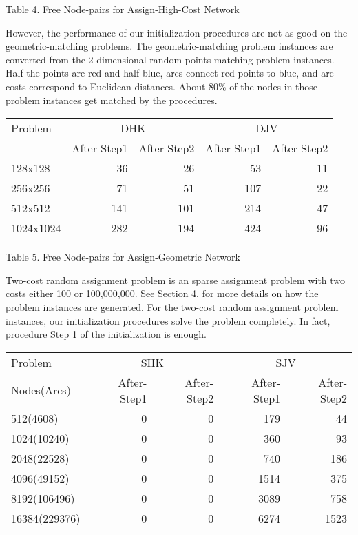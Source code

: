 \vskip 2pt
{Table 4. Free Node-pairs for Assign-High-Cost Network}
\vskip 5pt

However, the performance of our initialization procedures are 
not as good on the geometric-matching problems.
The geometric-matching problem instances are converted from the 2-dimensional
random points matching problem instances. 
Half the points are red and half blue, arcs 
connect red points to blue, and arc costs correspond to Euclidean
distances.
About 80\% of the nodes in those problem instances
get matched by the procedures.

\vskip 5pt
{\small
\begin{tabular}{|l|rr|rr|} \hline
 Problem & \multicolumn{2}{c|}{DHK}& \multicolumn{2}{c|}{DJV}\\
&After-Step1 &After-Step2 &After-Step1 &After-Step2\\ \hline
128x128& 36& 26& 53& 11\\ 
256x256& 71& 51& 107& 22\\ 
512x512& 141& 101& 214& 47\\ 
1024x1024& 282& 194& 424& 96\\ \hline
\end{tabular}
}

\vskip 2pt
{Table 5. Free Node-pairs for Assign-Geometric Network}
\vskip 5pt

Two-cost random assignment problem is an sparse assignment
problem with two costs either 100 or 100,000,000. See Section 4,
for more details on how the problem instances are generated.
For the two-cost random assignment problem instances, our initialization
procedures solve the problem completely. In fact, procedure Step 1 of the 
initialization is enough.

\vskip 5pt
{\small
\begin{tabular}{|l|rr|rr|} \hline
 Problem & \multicolumn{2}{c|}{SHK}& \multicolumn{2}{c|}{SJV}\\
Nodes(Arcs)&After-Step1 &After-Step2 &After-Step1 &After-Step2\\ \hline
512(4608)& 0& 0& 179& 44\\  
1024(10240)& 0& 0& 360& 93\\ 
2048(22528)& 0& 0& 740& 186\\ 
4096(49152)& 0& 0& 1514& 375\\ 
8192(106496)& 0& 0& 3089& 758\\ 
16384(229376)& 0& 0& 6274& 1523\\ \hline
\end{tabular}
}


